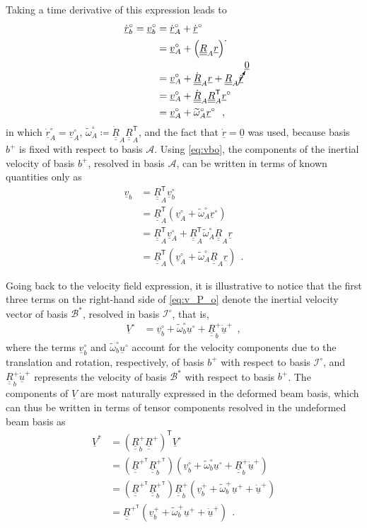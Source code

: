 \documentclass[12pt,a4paper,oneside,english]{abntex2} %
\newcommand{\vect}[1]{\underline{#1}}
\def\tens#1{\underline{\underline{#1}}}
\def\til#1{\widetilde{#1}}
\def\lp{\left(}
\def\rp{\right)}
\def\T{\mathsf{T}}
\def\A{\mathcal{A}}
\def\bp{b^+}
\def\Io{\mathcal{I}^{\circ}}
\def\dotout{^{\boldsymbol{\cdot}}}
\def\R{\tens{R}}
\def\Rp{\R^+}
\def\RpT{\R^{+^\T}}
\def\Rbp{\R^{+}_b}
\def\RbpT{\R^{+^\T}_b}
\def\RA{\R_A}
\def\RAT{\R^\T_A}
\def\RAdot{\dot{\R}_A}
\def\r{\vect{r}}
\def\ro{\r^{\circ}}
\def\rdot{\dot{\r}}
\def\rdoto{\rdot^{\circ}}
\def\rAdoto{\rdot^{\circ}_A}
\def\rbodot{\dot{\vect{r}}^{\circ}_b}
\def\u{\vect{u}}
\def\uplus{\u^{+}}
\def\uo{\u^{\circ}}
\def\updot{\dot{\u}^{+}}
\def\vb{\vect{v}_b}
\def\vA{\vect{v}_A}
\def\vAo{\vA^{\circ}}
\def\vbplus{\vb^{+}}
\def\vbo{\vb^{\circ}}
\def\omAtil{\til{\omega}_A}
\def\omAtilo{\omAtil^{\circ}}
\def\omtil{\til{\omega}_b}
\def\omtilp{\omtil^{+}}
\def\omtilo{\omtil^{\circ}}
\def\V{\vect{V}}
\def\Vs{\V^{*}}
\def\Vo{\V^{\circ}}
\def\zv{\vect{0}}
\begin{document}
Taking a time derivative of this expression leads to
\begin{align}
    \rbodot = \vbo &= \rAdoto + \rdoto
    \nonumber 
    \\
    &= \vAo + \lp\RA\r\rp\dotout
    \nonumber
    \\
    &= \vAo + \RAdot\r + \RA\cancelto{\zv}{\rdot}
    \nonumber
    \\
    &= \vAo + \RAdot\RAT\ro
    \nonumber
    \\
    &= \vAo + \omAtilo\ro \ \ ,
    \label{eq:vbo}
\end{align}
in which $\rAdoto = \vAo$, $\omAtilo \coloneqq \RAdot\RAT$, and the fact that $\rdot = \vect{0}$ was used, because basis $\bp$ is fixed with respect to basis $\A$. Using \cref{eq:vbo}, the components of the inertial velocity of basis $\bp$, resolved in basis $\A$, can be written in terms of known quantities only as
\begin{align}
    \vb &= \RAT\vbo
    \nonumber 
    \\
    &= \RAT \lp\vAo + \omAtilo\ro\rp
    \nonumber 
    \\
    &= \RAT\vAo + \RAT\omAtilo\RA\r
    \nonumber 
    \\
    &= \RAT\lp\vAo + \omAtilo\RA\r\rp \ \ .
    \label{eq:vb}
\end{align}

Going back to the velocity field expression, it is illustrative to notice that the first three terms on the right-hand side of \cref{eq:v_P_o} denote the inertial velocity vector of basis $\mathcal{B}^{*}$, resolved in basis $\Io$, that is,
\begin{align}
    \Vo &= \vbo + \omtilo\uo + \Rbp\updot \ \ ,
    \label{eq:V_o}
\end{align}
where the terms $\vbo$ and $\omtilo\uo$ account for the velocity components due to the translation and rotation, respectively, of basis $\bp$ with respect to basis $\Io$, and $\Rbp\updot$ represents the velocity of basis $\mathcal{B}^{*}$ with respect to basis $\bp$. The components of $\V$ are most naturally expressed in the deformed beam basis, which can thus be written in terms of tensor components resolved in the undeformed beam basis as
\begin{align}
    \Vs &= \lp\Rbp\Rp\rp^\T \Vo
    \label{eq:V_star_initial} 
    \\
    &= \lp\RpT\RbpT\rp \lp\vbo + \omtilo\uo + \Rbp\updot\rp \nonumber 
    \\
    &= \lp\RpT\RbpT\rp\Rbp \lp\vbplus + \omtilp\uplus + \updot\rp \nonumber 
    \\
    &= \RpT \lp\vbplus + \omtilp\uplus + \updot\rp \ \ .
    \label{eq:V_star}
\end{align}
\end{document}
